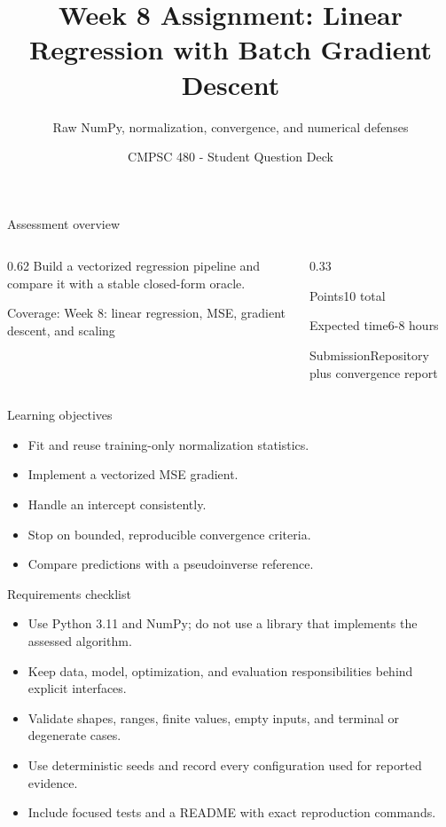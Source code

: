 \documentclass[aspectratio=169,11pt]{beamer}
\title[Week 8 Assignment Questions]{Week 8 Assignment: Linear Regression with Batch Gradient Descent}
\subtitle{Raw NumPy, normalization, convergence, and numerical defenses}
\author{CMPSC 480 - Student Question Deck}
\date{}
\begin{document}
\begin{frame}
  \titlepage
\end{frame}

\begin{frame}{Assessment overview}
\begin{columns}[T,onlytextwidth]
\begin{column}{0.62\textwidth}
\Large Build a vectorized regression pipeline and compare it with a stable closed-form oracle.

\vspace{0.35cm}
\normalsize
Coverage: Week 8: linear regression, MSE, gradient descent, and scaling
\end{column}
\begin{column}{0.33\textwidth}
\begin{block}{Points}10 total\end{block}
\begin{block}{Expected time}6-8 hours\end{block}
\begin{block}{Submission}Repository plus convergence report\end{block}
\end{column}
\end{columns}
\end{frame}

\begin{frame}{Learning objectives}
\begin{itemize}
  \item Fit and reuse training-only normalization statistics.
  \item Implement a vectorized MSE gradient.
  \item Handle an intercept consistently.
  \item Stop on bounded, reproducible convergence criteria.
  \item Compare predictions with a pseudoinverse reference.
\end{itemize}
\end{frame}

\begin{frame}{Requirements checklist}
\small
\begin{itemize}
  \item Use Python 3.11 and NumPy; do not use a library that implements the assessed algorithm.
  \item Keep data, model, optimization, and evaluation responsibilities behind explicit interfaces.
  \item Validate shapes, ranges, finite values, empty inputs, and terminal or degenerate cases.
  \item Use deterministic seeds and record every configuration used for reported evidence.
  \item Include focused tests and a README with exact reproduction commands.
\end{itemize}
\end{frame}
\end{document}
